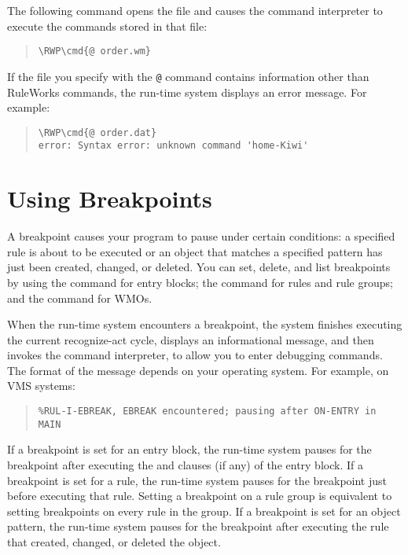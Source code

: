 The following command opens the file  and causes the
command interpreter to execute the commands stored in that file:

\begin{quote}
\begin{Verbatim}[commandchars=\\\{\}]
\RWP\cmd{@ order.wm}
\end{Verbatim}
\end{quote}

If the file you specify with the \verb|@| command contains information
other than RuleWorks commands, the run-time system displays an error
message. For example:

\begin{quote}
\begin{Verbatim}[commandchars=\\\{\}]
\RWP\cmd{@ order.dat}
error: Syntax error: unknown command 'home-Kiwi'
\end{Verbatim}
\end{quote}

\section{Using Breakpoints}

A breakpoint causes your program to pause under certain conditions: a
specified rule is about to be executed or an object that matches a
specified pattern has just been created, changed, or deleted. You can
set, delete, and list breakpoints by using the  command for
entry blocks; the  command for rules and rule groups; and
the  command for WMOs.

When the run-time system encounters a breakpoint, the system finishes
executing the current recognize-act cycle, displays an informational
message, and then invokes the command interpreter, to allow you to
enter debugging commands. The format of the message depends on your
operating system. For example, on VMS systems:

\begin{quote}
\begin{verbatim}
%RUL-I-EBREAK, EBREAK encountered; pausing after ON-ENTRY in MAIN
\end{verbatim}
\end{quote}

If a breakpoint is set for an entry block, the run-time system pauses
for the breakpoint after executing the  and 
clauses (if any) of the entry block. If a breakpoint is set for a
rule, the run-time system pauses for the breakpoint just before
executing that rule. Setting a breakpoint on a rule group is
equivalent to setting breakpoints on every rule in the group. If a
breakpoint is set for an object pattern, the run-time system pauses
for the breakpoint after executing the rule that created, changed, or
deleted the object.

